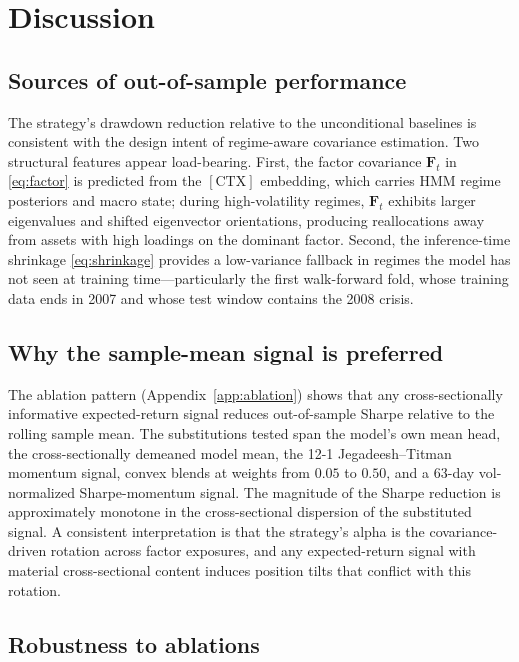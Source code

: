 \documentclass[11pt]{article}
\newcommand{\CTX}{[\mathrm{CTX}]}
\newcommand{\bF}{\mathbf{F}}
\begin{document}
\section{Discussion}\label{sec:discussion}

\subsection{Sources of out-of-sample performance}

The strategy's drawdown reduction relative to the unconditional
baselines is consistent with the design intent of regime-aware
covariance estimation. Two structural features appear load-bearing.
First, the factor covariance $\bF_t$ in \eqref{eq:factor} is predicted
from the $\CTX$ embedding, which carries HMM regime posteriors and
macro state; during high-volatility regimes, $\bF_t$ exhibits larger
eigenvalues and shifted eigenvector orientations, producing
reallocations away from assets with high loadings on the dominant
factor. Second, the inference-time shrinkage \eqref{eq:shrinkage}
provides a low-variance fallback in regimes the model has not seen at
training time---particularly the first walk-forward fold, whose
training data ends in 2007 and whose test window contains the 2008
crisis.

\subsection{Why the sample-mean signal is preferred}

The ablation pattern (Appendix~\ref{app:ablation}) shows that any
cross-sectionally informative expected-return signal reduces
out-of-sample Sharpe relative to the rolling sample mean. The
substitutions tested span the model's own mean head, the cross-sectionally
demeaned model mean, the 12-1 Jegadeesh--Titman momentum signal,
convex blends at weights from $0.05$ to $0.50$, and a 63-day
vol-normalized Sharpe-momentum signal. The magnitude of the Sharpe
reduction is approximately monotone in the cross-sectional dispersion
of the substituted signal. A consistent interpretation is that the
strategy's alpha is the covariance-driven rotation across factor
exposures, and any expected-return signal with material cross-sectional
content induces position tilts that conflict with this rotation.

\subsection{Robustness to ablations}
\end{document}
